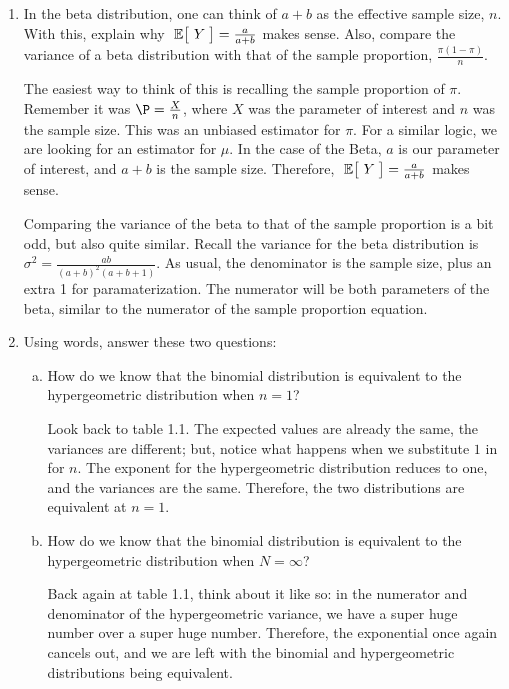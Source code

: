 \begin{enumerate}
  \item In the beta distribution, one can think of $a+b$ as the effective sample size, $n$. With this, explain why $\E{Y} = \frac{a}{a+b}$ makes sense. Also, compare the variance of a beta distribution with that of the sample proportion, $\frac{\pi(1-\pi)}{n}$.
\begin{solution}
The easiest way to think of this is recalling the sample proportion of $\pi$. Remember it was $\P = \frac{X}{n}$, where $X$ was the parameter of interest and $n$ was the sample size. This was an unbiased estimator for $\pi$. For a similar logic, we are looking for an estimator for $\mu$. In the case of the Beta, $a$ is our parameter of interest, and $a+b$ is the sample size. Therefore, $\E{Y} = \frac{a}{a+b}$ makes sense. 

Comparing the variance of the beta to that of the sample proportion is a bit odd, but also quite similar. Recall the variance for the beta distribution is $\sigma^{2} = \frac{ab}{(a + b)^{2} (a +b + 1)}$. As usual, the denominator is the sample size, plus an extra 1 for paramaterization. The numerator will be both parameters of the beta, similar to the numerator of the sample proportion equation. 
\end{solution}

  \item Using words, answer these two questions: 
  \begin{enumerate}[a) ]
   \item How do we know that the binomial distribution is equivalent to the hypergeometric distribution when $n=1$? 
\begin{solution}
Look back to table 1.1. The expected values are already the same, the variances are different; but, notice what happens when we substitute $1$ in for $n$. The exponent for the hypergeometric distribution reduces to one, and the variances are the same. Therefore, the two distributions are equivalent at $n = 1$. 
\end{solution}
   \item How do we know that the binomial distribution is equivalent to the hypergeometric distribution when $N=\infty$?
\begin{solution}
Back again at table 1.1, think about it like so: in the numerator and denominator of the hypergeometric variance, we have a super huge number over a super huge number. Therefore, the exponential once again cancels out, and we are left with the binomial and hypergeometric distributions being equivalent. 
\end{solution}
  \end{enumerate}
  

\end{enumerate}
